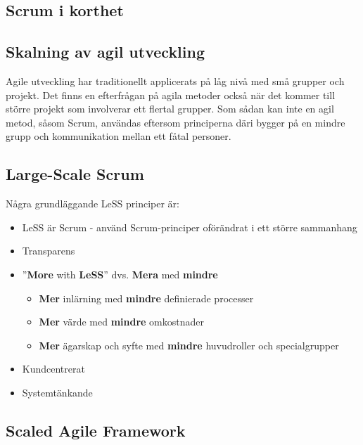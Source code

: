 	\subsection{Scrum i korthet}
	
	
	
		
	
	\subsection{Skalning av agil utveckling}
	
	Agile utveckling har traditionellt applicerats på låg nivå med små grupper och projekt. Det finns en efterfrågan på agila metoder också när det kommer till större projekt som involverar ett flertal grupper. Som sådan kan inte en agil metod, såsom Scrum, användas eftersom principerna däri bygger på en mindre grupp och kommunikation mellan ett fåtal personer.
	
	\subsection{Large-Scale Scrum}
	
	
	
	
	Några grundläggande LeSS principer är: \cite{less_principles}
	
	\begin{itemize}
		\setlength{\itemsep}{1pt}
		\item LeSS är Scrum - använd Scrum-principer oförändrat i ett större sammanhang			
		\item Transparens
		\item ''\textbf{More} with \textbf{LeSS}'' dvs. \textbf{Mera} med \textbf{mindre}
			\begin{itemize}
				\item \textbf{Mer} inlärning med \textbf{mindre} definierade processer
				\item \textbf{Mer} värde med \textbf{mindre} omkostnader
				\item \textbf{Mer} ägarskap och syfte med \textbf{mindre} huvudroller och specialgrupper
			\end{itemize}
		\item Kundcentrerat
		\item Systemtänkande
	\end{itemize}
	
	\subsection{Scaled Agile Framework}
	
